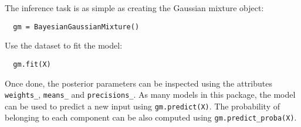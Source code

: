 The inference task is as simple as creating the Gaussian mixture object:
\begin{verbatim}
  gm = BayesianGaussianMixture()
\end{verbatim}
Use the dataset to fit the model:
\begin{verbatim}
  gm.fit(X)
\end{verbatim}

Once done, the posterior parameters can be inspected using the attributes \texttt{weights\_}, \texttt{means\_} and \texttt{precisions\_}. As many models in this package, the model can be used to predict a new input using \texttt{gm.predict(X)}. The probability of belonging to each component can be also computed using \texttt{gm.predict\_proba(X)}.
